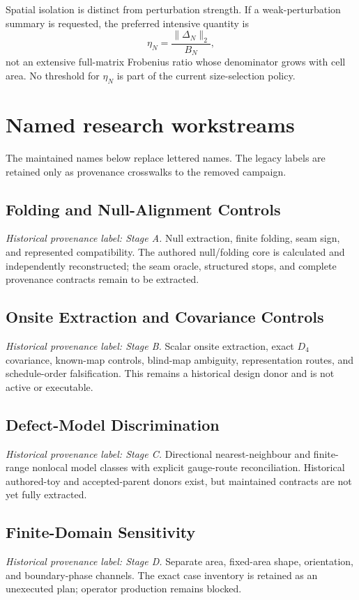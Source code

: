 \documentclass[11pt]{article}
\begin{document}
Spatial isolation is distinct from perturbation strength.  If a weak-perturbation
summary is requested, the preferred intensive quantity is
\begin{equation}
  \eta_N=\frac{\lVert\Delta_N\rVert_2}{B_N},
  \label{eq:weakness-ratio}
\end{equation}
not an extensive full-matrix Frobenius ratio whose denominator grows with cell area.
No threshold for $\eta_N$ is part of the current size-selection policy.

\section{Named research workstreams}

The maintained names below replace lettered names.  The legacy labels are retained only
as provenance crosswalks to the removed campaign.

\subsection{Folding and Null-Alignment Controls}
\noindent\textit{Historical provenance label: Stage A.}
Null extraction, finite folding, seam sign, and represented compatibility.  The
authored null/folding core is calculated and independently reconstructed; the seam
oracle, structured stops, and complete provenance contracts remain to be extracted.

\subsection{Onsite Extraction and Covariance Controls}
\noindent\textit{Historical provenance label: Stage B.}
Scalar onsite extraction, exact $D_4$ covariance, known-map controls, blind-map
ambiguity, representation routes, and schedule-order falsification.  This remains a
historical design donor and is not active or executable.

\subsection{Defect-Model Discrimination}
\noindent\textit{Historical provenance label: Stage C.}
Directional nearest-neighbour and finite-range nonlocal model classes with explicit
gauge-route reconciliation.  Historical authored-toy and accepted-parent donors exist,
but maintained contracts are not yet fully extracted.

\subsection{Finite-Domain Sensitivity}
\noindent\textit{Historical provenance label: Stage D.}
Separate area, fixed-area shape, orientation, and boundary-phase channels.  The exact
case inventory is retained as an unexecuted plan; operator production remains blocked.
\end{document}
